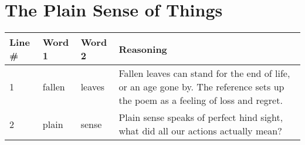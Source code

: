 \documentclass[a4paper,12pt]{article}
\begin{document}
\section*{The Plain Sense of Things}
\begin{center}
	\begin{tabular}{|l|l|l|p{2.5in}|}
	\hline
	Line \#& Word 1 & Word 2 & Reasoning \\ \hline
	1&fallen&leaves&Fallen leaves can stand for the end of life, or an age gone by.  The reference sets up the poem as a feeling of loss and regret.\\ \hline
	2&plain&sense&Plain sense speaks of perfect hind sight, what did all our actions actually mean?\\ \hline
	\end{tabular}
\end{center}
\end{document}
